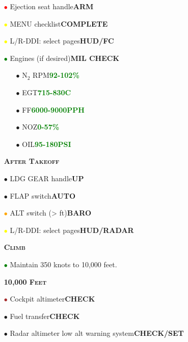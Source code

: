 \documentclass[a4paper,12pt,dvipsnames]{letter}
\newcommand{\button}[1]{\textbf{#1}}
\newcommand{\degC}{\textdegree{}C}
\newcommand{\ok}[1]{\textcolor{Green}{\textbf{#1}}}
\newcommand{\myHead}[1]{{\LARGE\textsc{\textbf{#1}}}}
\newcommand{\myhead}[1]{{\large\textsc{\textbf{#1}}}}
\newcommand{\bi}{\textcolor{ProcessBlue}{$\bullet$\;}}
\newcommand{\ri}{\textcolor{Red}{$\bullet$\;}}
\newcommand{\gi}{\textcolor{Green}{$\bullet$\;}}
\newcommand{\yi}{\textcolor{Yellow}{$\bullet$\;}}
\newcommand{\oi}{\textcolor{Orange}{$\bullet$\;}}
\renewcommand{\ni}{\textcolor{Brown}{$\bullet$\;}}
\begin{document}
{\begin{itemize}
 \item[\ri] Ejection seat handle\dotfill\button{ARM} 
 \item[\yi] MENU checklist\dotfill\button{COMPLETE}
 \item[\yi] L/R-DDI: select pages\dotfill\button{HUD/FC} 
 \item[\gi] Engines (if desired)\dotfill\button{MIL CHECK}
 \begin{itemize}
  \item[\bi] N$_2$ RPM\dotfill\ok{92-102\%}
  \item[\bi] EGT\dotfill\ok{715-830\degC}
  \item[\bi] FF\dotfill\ok{6000-9000\;PPH}
  \item[\bi] NOZ\dotfill\ok{0-57\%}
  \item[\bi] OIL\dotfill\ok{95-180\;PSI}
 \end{itemize}
\end{itemize} 
\vspace{0.5em}
\begin{itemize}
 \item[] \myHead{After Takeoff}
 \item[\bi] LDG GEAR handle\dotfill\button{UP}
 \item[\bi] FLAP switch\dotfill\button{AUTO}
 \item[\oi] ALT switch (> ft)\dotfill\button{BARO}
 \item[\yi] L/R-DDI: select pages\dotfill\button{HUD/RADAR}
\end{itemize}
\newpage
\begin{itemize}
 \item[] \myHead{Climb}
 \item[\gi] Maintain 350 knots to 10,000 feet.
 \vspace{0.3em}
 \item[] \myhead{10,000 Feet}
 \item[\ni] Cockpit altimeter\dotfill\button{CHECK}
 \item[\bi] Fuel transfer\dotfill\button{CHECK}
 \item[\bi] Radar altimeter low alt warning system\dotfill\button{CHECK/SET}
\end{itemize}
}
\end{document}
